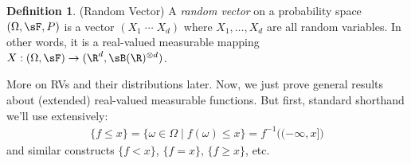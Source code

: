 \documentclass[12pt]{article}
\theoremstyle{plain}
\theoremstyle{definition}
\newtheorem{defn}[thm]{Definition}
\theoremstyle{remark}
\newcommand{\ra}{\rightarrow}
\begin{document}
\begin{defn}(Random Vector)
A \emph{random vector} on a probability space $(\Omega,\sF,P)$ is a
vector $(X_1 \; \cdots \; X_d)$ where $X_1,\ldots,X_d$ are all random
variables. In other words, it is a real-valued measurable mapping
$X:(\Omega,\sF)\ra(\R^d,\sB(\R)^{\otimes d})$.
\end{defn}

More on RVs and their distributions later. Now, we just prove general
results about (extended) real-valued measurable functions.
But first, standard shorthand we'll use extensively:
\begin{align*}
  \{f\leq x\} = \{\omega\in\Omega\;|\;f(\omega)\leq x\}
  = f^{-1}\big((-\infty,x]\big)
\end{align*}
and similar constructs $\{f<x\}$, $\{f=x\}$, $\{f\geq x\}$, etc.
\end{document}
